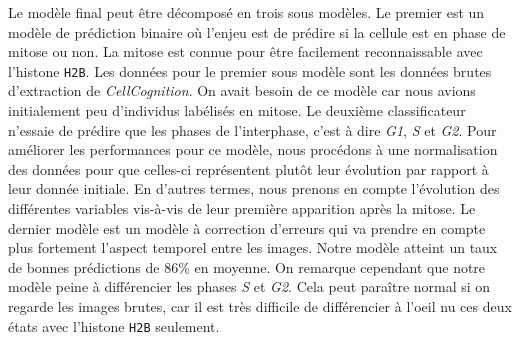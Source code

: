 \documentclass{article}
\begin{document}
\bigskip


Le modèle final peut être décomposé en trois sous modèles. Le premier est un modèle de prédiction binaire où l'enjeu est de prédire si la cellule est en phase de mitose ou non. La mitose est connue pour être facilement reconnaissable avec l'histone \texttt{H2B}. Les données pour le premier sous modèle sont les données brutes d'extraction de \textit{CellCognition}. On avait besoin de ce modèle car nous avions initialement peu d'individus labélisés en mitose. Le deuxième classificateur n'essaie de prédire que les phases de l'interphase, c'est à dire \textit{G1}, \textit{S} et \textit{G2}. Pour améliorer les performances pour ce modèle, nous procédons à une normalisation des données pour que celles-ci représentent plutôt leur évolution par rapport à leur donnée initiale. En d'autres termes, nous prenons en compte l'évolution des différentes variables vis-à-vis de leur première apparition après la mitose. Le dernier modèle est un modèle à correction d'erreurs qui va prendre en compte plus fortement l'aspect temporel entre les images. Notre modèle atteint un taux de bonnes prédictions de 86\% en moyenne. On remarque cependant que notre modèle peine à différencier les phases \textit{S} et \textit{G2}. Cela peut paraître normal si on regarde les images brutes, car il est très difficile de différencier à l'oeil nu ces deux états avec l'histone \texttt{H2B} seulement.

\bigskip
\end{document}
